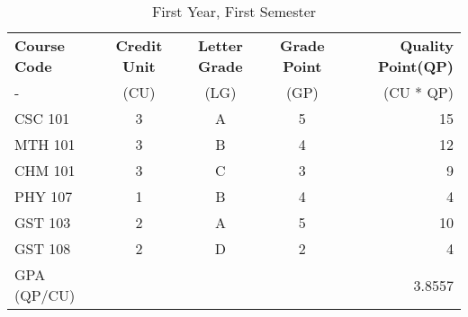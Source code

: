 \documentclass{article}
\begin{document}
	\begin{table}[h!]
		\begin{center}
			\caption{First Year, First Semester}
			\label{tab: table1}
			\begin{tabular}{l|c|c|c|r|}
			\cellcolor{red!15}\textbf{Course Code} & 	\cellcolor{red!15}\textbf{Credit Unit} &
					\cellcolor{red!15}\textbf{Letter Grade} & 	\cellcolor{red!15}\textbf{Grade Point} & 	\cellcolor{red!15}\textbf{Quality Point(QP)}\\
			\cellcolor{blue!15}- & \cellcolor{blue!15}(CU) & \cellcolor{blue!15}(LG) & \cellcolor{blue!15}(GP) & \cellcolor{blue!15}(CU * QP) \\
				\hline
				\cellcolor{blue!25}CSC 101 & 3 & A & 5 & 15\\
				\cellcolor{blue!15}MTH 101 & 3 & B & 4 & 12\\
				\cellcolor{blue!25}CHM 101 & 3 & C & 3 & 9\\
				\cellcolor{blue!15}PHY 107 & 1 & B & 4 & 4\\
				\cellcolor{blue!25}GST 103 & 2 & A & 5 & 10\\
				\cellcolor{blue!15}GST 108 & 2 & D & 2 & 4\\
				\hline
				\cellcolor{yellow!20}GPA (QP/CU) &	\cellcolor{yellow!20}  &	\cellcolor{yellow!20}  &	\cellcolor{yellow!20}  &	\cellcolor{yellow!20} 3.8557\\
				\hline
			\end{tabular}
		\end{center}
	\end{table}
\end{document}
